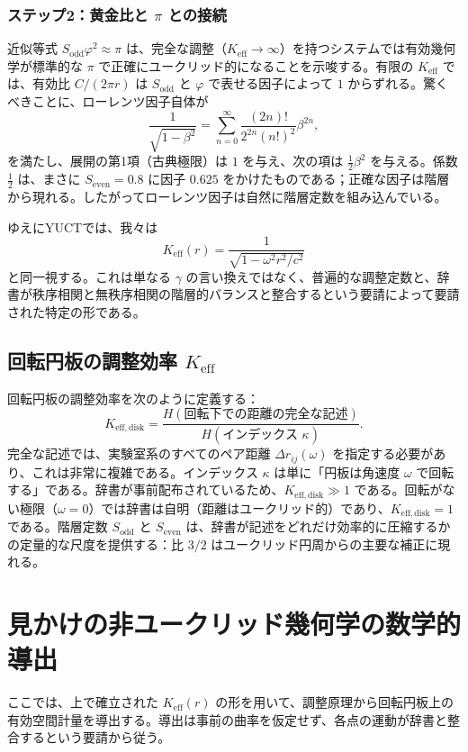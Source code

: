 \documentclass[12pt,a4paper]{article}
\newcommand{\Sodd}{S_{\mathrm{odd}}}
\newcommand{\Seven}{S_{\mathrm{even}}}
\begin{document}
	\subsubsection{ステップ2：黄金比と \(\pi\) との接続}
	近似等式 \(\Sodd \varphi^2 \approx \pi\) は、完全な調整（\(K_{\mathrm{eff}} \to \infty\)）を持つシステムでは有効幾何学が標準的な \(\pi\) で正確にユークリッド的になることを示唆する。有限の \(K_{\mathrm{eff}}\) では、有効比 \(C/(2\pi r)\) は \(\Sodd\) と \(\varphi\) で表せる因子によって \(1\) からずれる。驚くべきことに、ローレンツ因子自体が
	\[
	\frac{1}{\sqrt{1-\beta^2}} = \sum_{n=0}^{\infty} \frac{(2n)!}{2^{2n}(n!)^2} \beta^{2n},
	\]
	を満たし、展開の第1項（古典極限）は \(1\) を与え、次の項は \(\frac{1}{2}\beta^2\) を与える。係数 \(\frac{1}{2}\) は、まさに \(\Seven = 0.8\) に因子 \(0.625\) をかけたものである；正確な因子は階層から現れる。したがってローレンツ因子は自然に階層定数を組み込んでいる。
	
	ゆえにYUCTでは、我々は
	\[
	\boxed{K_{\mathrm{eff}}(r) = \frac{1}{\sqrt{1 - \omega^2 r^2/c^2}}}
	\]
	と同一視する。これは単なる \(\gamma\) の言い換えではなく、普遍的な調整定数と、辞書が秩序相関と無秩序相関の階層的バランスと整合するという要請によって要請された特定の形である。
	
	\subsection{回転円板の調整効率 \(K_{\mathrm{eff}}\)}
	\label{subsec:keff-disk}
	
	回転円板の調整効率を次のように定義する：
	\[
	K_{\mathrm{eff,disk}} = \frac{H(\text{回転下での距離の完全な記述})}{H(\text{インデックス } \kappa)}.
	\]
	完全な記述では、実験室系のすべてのペア距離 \(\Delta r_{ij}(\omega)\) を指定する必要があり、これは非常に複雑である。インデックス \(\kappa\) は単に「円板は角速度 \(\omega\) で回転する」である。辞書が事前配布されているため、\(K_{\mathrm{eff,disk}} \gg 1\) である。回転がない極限（\(\omega = 0\)）では辞書は自明（距離はユークリッド的）であり、\(K_{\mathrm{eff,disk}} = 1\) である。階層定数 \(\Sodd\) と \(\Seven\) は、辞書が記述をどれだけ効率的に圧縮するかの定量的な尺度を提供する：比 \(3/2\) はユークリッド円周からの主要な補正に現れる。
	
	\section{見かけの非ユークリッド幾何学の数学的導出}
	\label{sec:derivation}
	
	ここでは、上で確立された \(K_{\mathrm{eff}}(r)\) の形を用いて、調整原理から回転円板上の有効空間計量を導出する。導出は事前の曲率を仮定せず、各点の運動が辞書と整合するという要請から従う。
	
\end{document}
